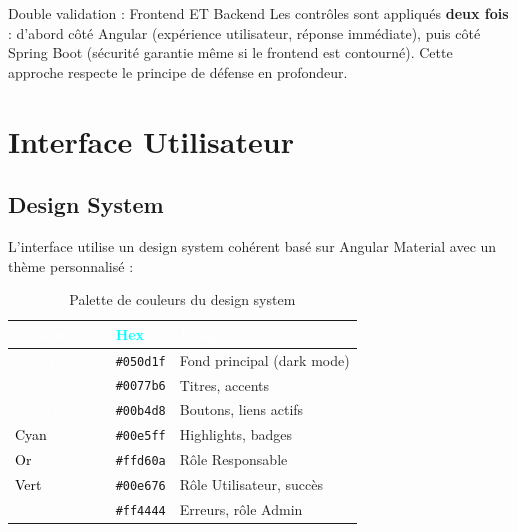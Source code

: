 \documentclass[12pt,a4paper]{report}
\begin{document}
\begin{notebox}{Double validation : Frontend ET Backend}
  Les contr\^{o}les sont appliqu\'{e}s \textbf{deux fois} : d'abord c\^{o}t\'{e} Angular (exp\'{e}rience utilisateur, r\'{e}ponse imm\'{e}diate), puis c\^{o}t\'{e} Spring Boot (s\'{e}curit\'{e} garantie m\^{e}me si le frontend est contourn\'{e}). Cette approche respecte le principe de d\'{e}fense en profondeur.
\end{notebox}

\clearpage
\chapter{Interface Utilisateur}

\section{Design System}

L'interface utilise un design system coh\'{e}rent bas\'{e} sur Angular Material avec un th\`{e}me personnalis\'{e} :

\begin{table}[H]
\centering
\caption{Palette de couleurs du design system}
\small
\begin{tabularx}{\textwidth}{|C{3.5cm}|C{3.5cm}|X|}
\hline
{} \textcolor{white}{\textbf{Couleur}} & \textcolor{cyan}{\textbf{Hex}} & \textcolor{white}{\textbf{Usage}} \\
\hline
{}\textcolor{white}{Fond primaire} & \texttt{\#050d1f} & Fond principal (dark mode) \\
\hline
{}\textcolor{white}{Bleu m\'{e}dium} & \texttt{\#0077b6} & Titres, accents \\
\hline
{}\textcolor{white}{Bleu clair} & \texttt{\#00b4d8} & Boutons, liens actifs \\
\hline
{}\textcolor{black}{Cyan} & \texttt{\#00e5ff} & Highlights, badges \\
\hline
{}\textcolor{black}{Or} & \texttt{\#ffd60a} & R\^{o}le Responsable \\
\hline
{}\textcolor{black}{Vert} & \texttt{\#00e676} & R\^{o}le Utilisateur, succ\`{e}s \\
\hline
{}\textcolor{white}{Rouge} & \texttt{\#ff4444} & Erreurs, r\^{o}le Admin \\
\hline
\end{tabularx}
\end{table}
\end{document}
